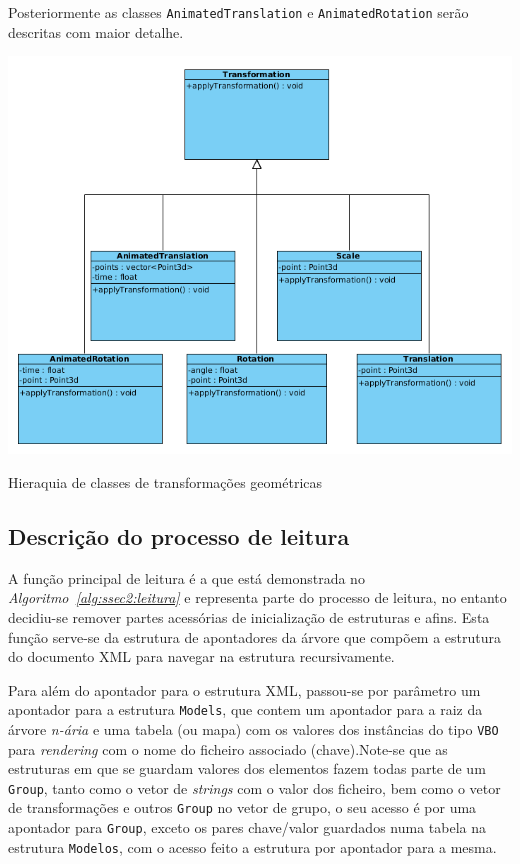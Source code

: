Posteriormente as classes \texttt{AnimatedTranslation}
e \texttt{AnimatedRotation} serão descritas com maior detalhe.



\begin{center} 	
\includegraphics[width=\textwidth,height=\textheight,keepaspectratio]{resources/classes.png}
\captionsetup{type=figure, width=0.8\linewidth}
\caption{Hieraquia de classes de transformações geométricas}
\label{fig:ssec2:class} 
\end{center}


\subsection{Descrição do processo de leitura}

A função principal de leitura é a que está demonstrada no
\emph{Algoritmo~\ref{alg:ssec2:leitura}} e representa parte do processo de
leitura, no entanto decidiu-se remover partes acessórias de inicialização de
estruturas e afins. Esta função serve-se da estrutura de apontadores da árvore
que compõem a estrutura do documento XML para navegar na estrutura
recursivamente. 

Para além do apontador para o estrutura XML, passou-se por parâmetro um
apontador para a estrutura \texttt{Models}, que contem um apontador para a raiz
da árvore \emph{n-ária} e uma tabela (ou mapa) com os valores dos instâncias do
tipo \texttt{VBO}  para \emph{rendering} com o nome do ficheiro associado
(chave).Note-se que as estruturas em que se guardam valores dos elementos fazem
todas parte de um \texttt{Group}, tanto como o vetor de \emph{strings} com
o valor dos ficheiro, bem como o vetor de transformações e outros \texttt{Group}
no vetor de grupo, o seu acesso é por uma apontador para \texttt{Group}, exceto
os pares chave/valor guardados numa tabela na estrutura \texttt{Modelos}, com
o acesso feito a estrutura por apontador para a mesma.  

